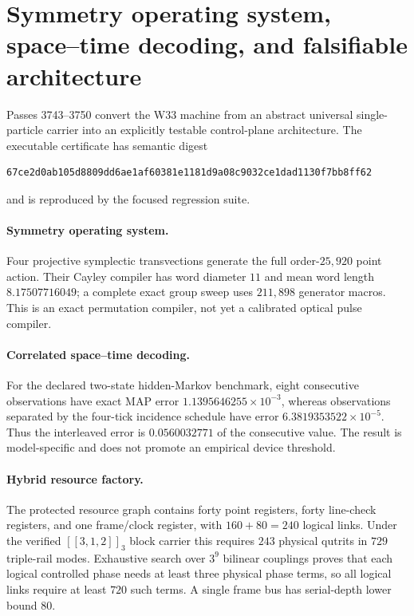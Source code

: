 \section{Symmetry operating system, space--time decoding, and falsifiable architecture}
\label{sec:bt3743-3750}

Passes 3743--3750 convert the W33 machine from an abstract universal single-particle carrier into an explicitly testable control-plane architecture.  The executable certificate has semantic digest
\begin{verbatim}
67ce2d0ab105d8809dd6ae1af60381e1181d9a08c9032ce1dad1130f7bb8ff62
\end{verbatim}
and is reproduced by the focused regression suite.

\paragraph{Symmetry operating system.}
Four projective symplectic transvections generate the full order-$25{,}920$ point action.  Their Cayley compiler has word diameter $11$ and mean word length $8.17507716049$; a complete exact group sweep uses $211{,}898$ generator macros.  This is an exact permutation compiler, not yet a calibrated optical pulse compiler.

\paragraph{Correlated space--time decoding.}
For the declared two-state hidden-Markov benchmark, eight consecutive observations have exact MAP error $1.1395646255\times10^{-3}$, whereas observations separated by the four-tick incidence schedule have error $6.3819353522\times10^{-5}$.  Thus the interleaved error is $0.0560032771$ of the consecutive value.  The result is model-specific and does not promote an empirical device threshold.

\paragraph{Hybrid resource factory.}
The protected resource graph contains forty point registers, forty line-check registers, and one frame/clock register, with $160+80=240$ logical links.  Under the verified $[[3,1,2]]_3$ block carrier this requires $243$ physical qutrits in $729$ triple-rail modes.  Exhaustive search over $3^9$ bilinear couplings proves that each logical controlled phase needs at least three physical phase terms, so all logical links require at least $720$ such terms.  A single frame bus has serial-depth lower bound $80$.

